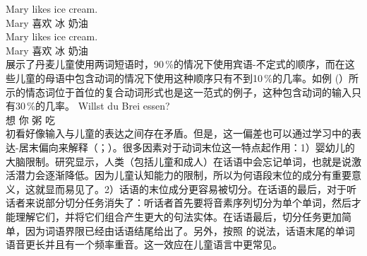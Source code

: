 \eal
\ex 
\gll Mary likes ice cream.\\
	 Mary 喜欢 冰 奶油\\
\ex 
\gll Mary likes ice cream.\\
	 Mary 喜欢 冰 奶油\\
\zl
 \citet*[]{WKG2001a}展示了丹麦儿童使用两词短语时，90\,\%的情况下使用宾语-不定式的顺序，而在这些儿童的母语中包含动词的情况下使用这种顺序只有不到10\,\%的几率。如例 (）所示的情态词位于首位的复合动词形式也是这一范式的例子，这种包含动词的输入只有30\,\%\citep*[]{WKG2001a}的几率。
\ea
\gll Willst du Brei essen?\\
     想   你 粥 吃\\
\z
初看好像输入与儿童的表达之间存在矛盾。但是，这一偏差也可以通过学习中的表达-居末偏向来解释（\citealp{WKG2001a}；\citealp*{FPG2006a}）。很多因素对于动词末位这一特点起作用：1）婴幼儿的大脑限制。研究显示，人类（包括儿童和成人）在话语中会忘记单词，也就是说激活潜力会逐渐降低。因为儿童认知能力的限制，所以为何语段末位的成分有重要意义，这就显而易见了。2）话语的末位成分更容易被切分。在话语的最后，对于听话者来说部分切分任务消失了：听话者首先要将音素序列切分为单个单词，然后才能理解它们，并将它们组合产生更大的句法实体。在话语最后，切分任务更加简单，因为词语界限已经由话语结尾给出了。另外，按照 \citet*[]{WKG2001a}的说法，话语末尾的单词语音更长并且有一个频率重音。这一效应在儿童语言中更常见。
